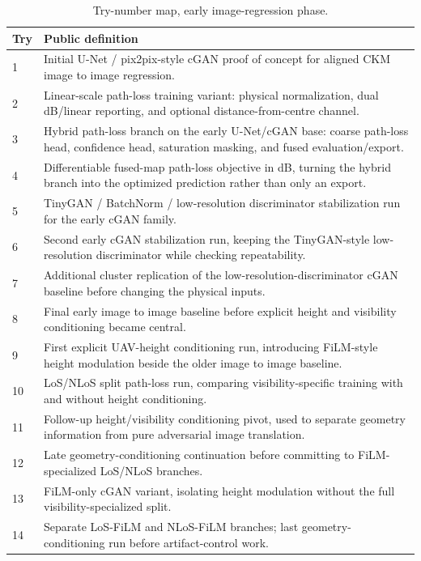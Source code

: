 \begin{table}[H]
\centering
\caption{Try-number map, early image-regression phase.}
\label{tab:try_map_early}
\tiny
\renewcommand{\arraystretch}{0.78}
\setlength{\tabcolsep}{2pt}
\begin{tabularx}{\textwidth}{p{}>{\raggedright\arraybackslash}X}
\toprule
Try & Public definition \\
\midrule
1 & Initial U-Net / pix2pix-style cGAN proof of concept for aligned CKM image to image regression. \\
2 & Linear-scale path-loss training variant: physical normalization, dual dB/linear reporting, and optional distance-from-centre channel. \\
3 & Hybrid path-loss branch on the early U-Net/cGAN base: coarse path-loss head, confidence head, saturation masking, and fused evaluation/export. \\
4 & Differentiable fused-map path-loss objective in dB, turning the hybrid branch into the optimized prediction rather than only an export. \\
5 & TinyGAN / BatchNorm / low-resolution discriminator stabilization run for the early cGAN family. \\
6 & Second early cGAN stabilization run, keeping the TinyGAN-style low-resolution discriminator while checking repeatability. \\
7 & Additional cluster replication of the low-resolution-discriminator cGAN baseline before changing the physical inputs. \\
8 & Final early image to image baseline before explicit height and visibility conditioning became central. \\
9 & First explicit UAV-height conditioning run, introducing FiLM-style height modulation beside the older image to image baseline. \\
10 & LoS/NLoS split path-loss run, comparing visibility-specific training with and without height conditioning. \\
11 & Follow-up height/visibility conditioning pivot, used to separate geometry information from pure adversarial image translation. \\
12 & Late geometry-conditioning continuation before committing to FiLM-specialized LoS/NLoS branches. \\
13 & FiLM-only cGAN variant, isolating height modulation without the full visibility-specialized split. \\
14 & Separate LoS-FiLM and NLoS-FiLM branches; last geometry-conditioning run before artifact-control work. \\

\end{tabularx}
\end{table}
